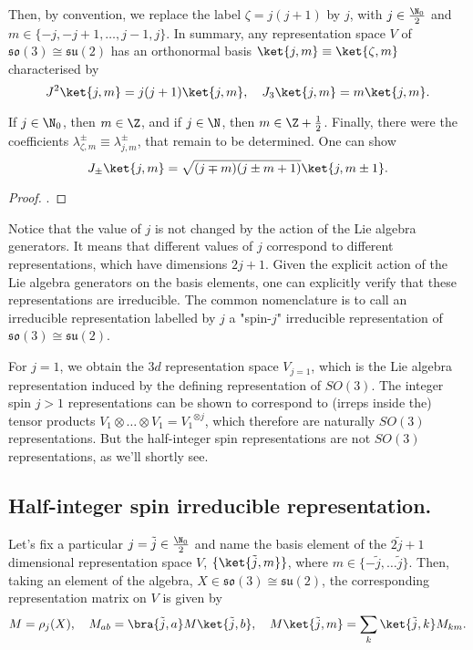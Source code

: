 Then, by convention, we replace the label $\zeta = j (j+1)$ by $j$, with $j \in \frac{\N_0}{2}$ and $m \in \{ -j, -j+1, \dots, j-1, j \}$. In summary, any representation space $V$ of $\mathfrak{so}(3) \cong \mathfrak{su}(2)$ has an orthonormal basis $\ket{j,m} \equiv \ket{\zeta, m}$ characterised by
\begin{equation}
    J^2 \ket{j,m} = j(j+1) \ket{j,m}, \quad J_3 \ket{j,m} = m \ket{j,m} .
\end{equation}

If $j \in \N_0$, then $m \in \Z$, and if $j \in \N$, then $m \in \Z + \frac{1}{2}$. Finally, there were the coefficients $\lambda^\pm_{\zeta, m} \equiv \lambda^\pm_{j,m}$, that remain to be determined. One can show
\begin{equation}
    J_\pm \ket{j,m} = \sqrt{(j \mp m)(j \pm m + 1)} \ket{j,m \pm 1} .
\end{equation}
\begin{proof}
    .
\end{proof}

Notice that the value of $j$ is not changed by the action of the Lie algebra generators. It means that different values of $j$ correspond to different representations, which have dimensions $2j +1$. Given the explicit action of the Lie algebra generators on the basis elements, one can explicitly verify that these representations are irreducible. The common nomenclature is to call an irreducible representation labelled by $j$ a "spin-$j$" irreducible representation of $\mathfrak{so}(3) \cong \mathfrak{su}(2)$.

For $j=1$, we obtain the $3d$ representation space $V_{j=1}$, which is the Lie algebra representation induced by the defining representation of $SO(3)$. The integer spin $j>1$ representations can be shown to correspond to (irreps inside the) tensor
products $V_1 \otimes \dots \otimes V_1 = {V_1}^{\otimes j}$, which therefore are naturally $SO(3)$ representations. But the half-integer spin representations are not $SO(3)$ representations, as we'll shortly see.


\subsection{Half-integer spin irreducible representation.}
Let's fix a particular $j = \tilde{j} \in \frac{\N_0}{2}$ and name the basis element of the $2 \tilde{j} + 1$ dimensional representation space $V$, $\{ \ket{\tilde{j}, m} \}$, where $m \in \{ -\tilde{j}, \dots \tilde{j} \}$. Then, taking an element of the algebra, $X \in \mathfrak{so}(3) \cong \mathfrak{su}(2)$, the corresponding representation matrix on $V$ is given by
\begin{equation}
    M = \rho_j (X), \quad M_{ab} = \bra{\tilde{j},a} M \ket{\tilde{j},b}, \quad M \ket{\tilde{j}, m} = \sum_k \ket{\tilde{j}, k} M_{km} .
\end{equation}

